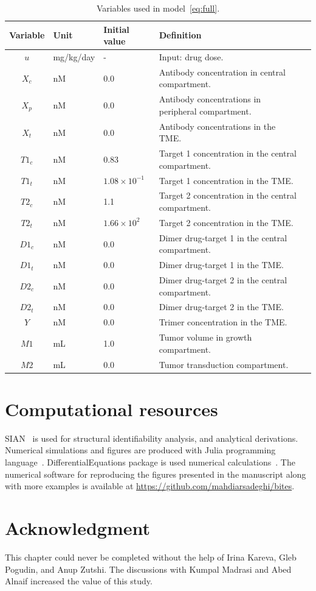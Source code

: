 \begin{landscape}
	
	\begin{table}[ht!]
		\centering
		\caption{Variables used in model~\eqref{eq:full}.}
		\begin{tabular}{c  l  l  l  l} 
			\hline
			Variable & Unit & Initial value &Definition \\ [0.5ex] 
			\hline
			$u$ & mg/kg/day & - & Input: drug dose.\\
			$X_c$ & nM & 0.0 & Antibody concentration in central compartment. \\ 
			$X_p$ & nM & 0.0 & Antibody concentrations in peripheral compartment. \\
			$X_t$ & nM & 0.0 & Antibody concentrations in the \ac{TME}.\\
			$T1_c$ & nM & 0.83 & Target 1 concentration in the central compartment. \\ 
			$T1_t$ & nM & $1.08 \times 10^{-1}$ & Target 1 concentration in the \ac{TME}. \\
			$T2_c$ & nM & 1.1 & Target 2 concentration in the central compartment.\\
			$T2_t$ & nM & $1.66\times 10^2$& Target 2 concentration in the \ac{TME}.\\
			$D1_c$ & nM & 0.0 & Dimer drug-target 1 in the central compartment. \\ 
			$D1_t$ & nM & 0.0 & Dimer drug-target 1 in the \ac{TME}. \\
			$D2_c$ & nM & 0.0 & Dimer drug-target 2 in the central compartment.\\
			$D2_t$ & nM & 0.0 & Dimer drug-target 2 in the \ac{TME}.\\
			$Y$ & nM & 0.0 & Trimer concentration in the \ac{TME}. \\
			$M1$ & mL & 1.0 & Tumor volume in growth compartment. \\
			$M2$ & mL & 0.0 & Tumor transduction compartment. \\[1ex] 
			\hline
		\end{tabular}
		\label{table:def2}
	\end{table}
\end{landscape}


\section*{Computational resources}
SIAN~\cite{hong2019sian} is used for structural identifiability analysis, and analytical derivations. Numerical simulations and figures are produced with Julia programming language~\cite{Julia-2017}. DifferentialEquations package is used numerical calculations~\cite{DifferentialEquations.jl-2017}. The numerical software for reproducing the figures presented in the manuscript along with more examples is available at \url{https://github.com/mahdiarsadeghi/bites}.

\section*{Acknowledgment}
This chapter could never be completed without the help of Irina Kareva, Gleb Pogudin, and Anup Zutshi. The discussions with Kumpal Madrasi and Abed Alnaif increased the value of this study.